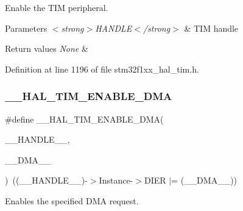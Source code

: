 Enable the T\+IM peripheral. 


\begin{DoxyParams}{Parameters}
{\em $<$strong$>$\+H\+A\+N\+D\+L\+E$<$/strong$>$} & T\+IM handle \\
\hline
\end{DoxyParams}

\begin{DoxyRetVals}{Return values}
{\em None} & \\
\hline
\end{DoxyRetVals}


Definition at line 1196 of file stm32f1xx\+\_\+hal\+\_\+tim.\+h.

\mbox{\label{group___t_i_m___exported___macros_gabb91ccd46cd7204c87170a1ea5b38135}} 
\subsubsection{\texorpdfstring{\+\_\+\+\_\+\+H\+A\+L\+\_\+\+T\+I\+M\+\_\+\+E\+N\+A\+B\+L\+E\+\_\+\+D\+MA}{\_\_HAL\_TIM\_ENABLE\_DMA}}
{\footnotesize\ttfamily \#define \+\_\+\+\_\+\+H\+A\+L\+\_\+\+T\+I\+M\+\_\+\+E\+N\+A\+B\+L\+E\+\_\+\+D\+MA(\begin{DoxyParamCaption}\item[{}]{\+\_\+\+\_\+\+H\+A\+N\+D\+L\+E\+\_\+\+\_\+,  }\item[{}]{\+\_\+\+\_\+\+D\+M\+A\+\_\+\+\_\+ }\end{DoxyParamCaption})~((\+\_\+\+\_\+\+H\+A\+N\+D\+L\+E\+\_\+\+\_\+)-\/$>$Instance-\/$>$D\+I\+ER $\vert$= (\+\_\+\+\_\+\+D\+M\+A\+\_\+\+\_\+))}



Enables the specified D\+MA request. 


